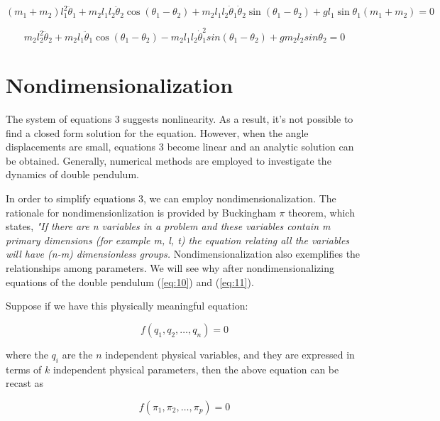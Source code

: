 \documentclass{article}
\begin{document}
\begin{equation} \label{eq:10}
(m_1+m_2)l_1^2 \ddot \theta_1 + m_2l_1l_2\ddot \theta_2 \cos(\theta_1 - \theta_2) + m_2l_1l_2\dot \theta_1 \dot \theta_2 \sin(\theta_1 - \theta_2) + gl_1 \sin\theta_1(m_1 + m_2) = 0
\end{equation}

\begin{equation} \label{eq:11}
m_2l_2^2\ddot \theta_2 + m_2l_1\ddot \theta_1\cos(\theta_1 - \theta_2) - m_2l_1l_2\dot \theta_1^2 sin(\theta_1 - \theta_2) + gm_2l_2sin\theta_2 = 0
\end{equation}


\section{Nondimensionalization}

The system of equations 3 suggests nonlinearity. As a result, it's not possible to find a closed form solution for the equation. However, when the angle displacements are small, equations 3 become linear and an analytic solution can be obtained. Generally, numerical methods are employed to investigate the dynamics of double pendulum. 

In order to simplify equations 3, we can employ nondimensionalization. The rationale for nondimensionlization is provided by Buckingham $\pi$ theorem, which states, \textit{"If there are n variables in a problem and these variables contain m primary dimensions (for example m, l, t) the equation relating all the variables will have (n-m) dimensionless groups.} Nondimensionalization also exemplifies the relationships among parameters. We will see why after nondimensionalizing equations of the double pendulum (\ref{eq:10}) and (\ref{eq:11}).

Suppose if we have this physically meaningful equation:


\begin{equation}
f(q_1,q_2,\ldots,q_n)=0
\end{equation}

where the $q_i$ are the $n$ independent physical variables, and they are expressed in terms of $k$ independent physical parameters, then the above equation can be recast as

\begin{equation}
f(\pi_1,\pi_2,\ldots,\pi_p)=0
\end{equation}
\end{document}
